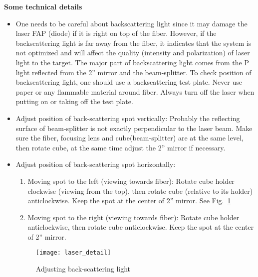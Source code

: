{\medskip
\noindent
{\bf{Some technical details}}
\begin{itemize}
\item One needs to be careful about backscattering light since it may
damage the laser FAP (diode) if it is right on top of the fiber.
However, if the backscattering light is far away from the fiber, it
indicates that the system is not optimized and will affect the quality
(intensity and polarization) of laser light to the target.  The major
part of backscattering light comes from the P light reflected from the
2'' mirror and the beam-splitter. To check position of backscattering 
light, one should use a backscattering
test plate.  Never use paper or any flammable material around fiber.
Always turn off the laser when putting on or taking off the test plate.

\item Adjust position of back-scattering spot vertically: 
Probably the reflecting surface of beam-splitter is not exactly
perpendicular to the laser beam.  Make sure the fiber, focusing lens
and cube(beam-splitter) are at the same level, then rotate cube, at
the same time adjust the 2'' mirror if necessary.

\item Adjust position of back-scattering spot horizontally:
\begin{enumerate}
\item Moving spot to the left (viewing towards fiber): Rotate cube
holder clockwise (viewing from the top), then rotate cube (relative
to its holder) anticlockwise.  Keep the spot at the center of 2''
mirror.  See Fig.~\ref{fig:laser_detail}

\item Moving spot to the right (viewing towards fiber): Rotate cube
holder anticlockwise, then rotate cube anticlockwise.  Keep the 
spot at the center of 2'' mirror.
\end{enumerate}

\begin{figure}
\begin{center}
\centerline{\texttt{[image: laser\_detail]}}
\end{center}
\caption{Adjusting back-scattering light}
\label{fig:laser_detail}
\end{figure}

\end{itemize}


}
